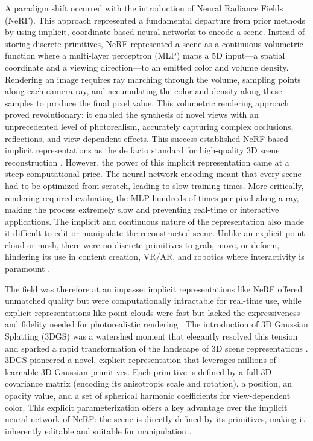 \documentclass[11pt]{article}
\begin{document}
A paradigm shift occurred with the introduction of Neural Radiance Fields (NeRF). This approach represented a fundamental departure from prior methods by using implicit, coordinate-based neural networks to encode a scene. Instead of storing discrete primitives, NeRF represented a scene as a continuous volumetric function where a multi-layer perceptron (MLP) maps a 5D input---a spatial coordinate and a viewing direction---to an emitted color and volume density. Rendering an image requires ray marching through the volume, sampling points along each camera ray, and accumulating the color and density along these samples to produce the final pixel value. This volumetric rendering approach proved revolutionary: it enabled the synthesis of novel views with an unprecedented level of photorealism, accurately capturing complex occlusions, reflections, and view-dependent effects. This success established NeRF-based implicit representations as the de facto standard for high-quality 3D scene reconstruction \cite{ref1,ref2}. However, the power of this implicit representation came at a steep computational price. The neural network encoding meant that every scene had to be optimized from scratch, leading to slow training times. More critically, rendering required evaluating the MLP hundreds of times per pixel along a ray, making the process extremely slow and preventing real-time or interactive applications. The implicit and continuous nature of the representation also made it difficult to edit or manipulate the reconstructed scene. Unlike an explicit point cloud or mesh, there were no discrete primitives to grab, move, or deform, hindering its use in content creation, VR/AR, and robotics where interactivity is paramount \cite{ref3}.

The field was therefore at an impasse: implicit representations like NeRF offered unmatched quality but were computationally intractable for real-time use, while explicit representations like point clouds were fast but lacked the expressiveness and fidelity needed for photorealistic rendering \cite{ref4}. The introduction of 3D Gaussian Splatting (3DGS) was a watershed moment that elegantly resolved this tension and sparked a rapid transformation of the landscape of 3D scene representations \cite{ref5,ref6}. 3DGS pioneered a novel, explicit representation that leverages millions of learnable 3D Gaussian primitives. Each primitive is defined by a full 3D covariance matrix (encoding its anisotropic scale and rotation), a position, an opacity value, and a set of spherical harmonic coefficients for view-dependent color. This explicit parameterization offers a key advantage over the implicit neural network of NeRF: the scene is directly defined by its primitives, making it inherently editable and suitable for manipulation \cite{ref1}.
\end{document}
